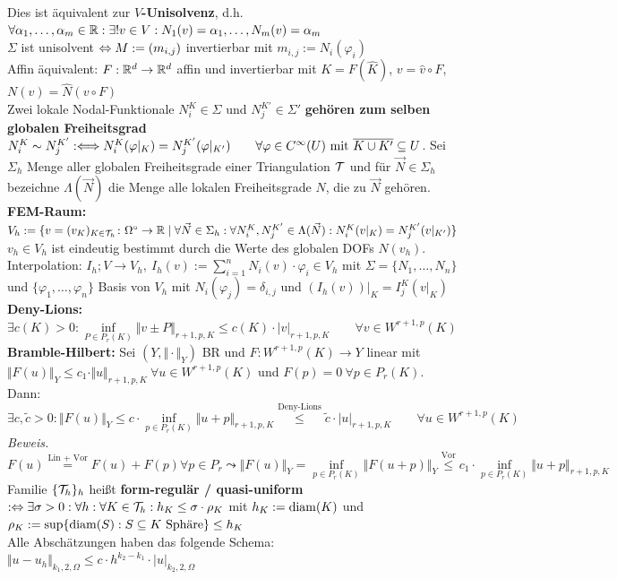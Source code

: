 \documentclass[12pt]{scrartcl}
\begin{document}
	Dies ist äquivalent zur \textbf{$V$-Unisolvenz}, d.h. $\forall\alpha_1,\ldots,\alpha_m\in\R:\exists! v\in V:N_1(v)=\alpha_1,\ldots,N_m(v)=\alpha_m$\\
	$\Sigma$ ist unisolvent $\gdw M:=(m_{i,j})$ invertierbar mit $m_{i,j}:=N_i(\varphi_i)$\\
	Affin äquivalent: $F:\R^d\to\R^d$ affin und invertierbar mit $K=F(\hat{K})$, $v=\hat{v}\circ F$, $N(v)=\hat{N}(v\circ F)$\\
	Zwei lokale Nodal-Funktionale $N_i^K\in\Sigma$ und $N_j^{K'}\in\Sigma'$ \textbf{gehören zum selben globalen Freiheitsgrad} $N_i^K\sim N_j^{K'}:\Longleftrightarrow N_i^K(\varphi|_K)=N_j^{K'}(\varphi|_{K'})\qquad\forall\varphi\in C^\infty(U)\mit\overline{K\cup K'}\subseteq U$.
	Sei $\Sigma_h$ Menge aller globalen Freiheitsgrade einer Triangulation $\T$ und für $\vec{N}\in\Sigma_h$ bezeichne $\Lambda(\vec{N})$ die Menge alle lokalen Freiheitsgrade $N$, die zu $\vec{N}$ gehören.\\
	\textbf{FEM-Raum:} $V_h:=\lbrace v=(v_{K})_{K\in\T_h}\colon\Omega^\circ\to\R\mid \forall \vec{N}\in\Sigma_h:\forall N_i^{K},N_j^{K'}\in\Lambda(\vec{N}):N_i^{K}(v|_K)=N_j^{K'}(v|_{K'})\rbrace$\\
	$v_h\in V_h$ ist eindeutig bestimmt durch die Werte des globalen DOFs $N(v_h)$.\\
	Interpolation: $I_h;V\to V_h,~I_h(v):=\sum\limits_{i=1}^n N_i(v)\cdot\varphi_i\in V_h$ mit $\Sigma=\lbrace N_1,\ldots,N_n\rbrace$ und $\lbrace\varphi_1,\ldots,\varphi_n\rbrace$ Basis von $V_h$ mit $N_i(\varphi_j)=\delta_{i,j}$ und $(I_h(v))|_K=I_j^K(v|_K)$\\
	\textbf{Deny-Lions:} $\exists c(K)>0:\inf\limits_{P\in P_r(K)}\Vert v\pm P\Vert_{r+1,p,K}\leq c(K)\cdot |v|_{r+1,p,K}\qquad\forall v\in W^{r+1,p}(K)$\\
	\textbf{Bramble-Hilbert:} Sei $(Y,\Vert\cdot\Vert_Y)$ BR und $F:W^{r+1,p}(K)\to Y$ linear mit $\big\Vert F(u)\Vert_Y\leq c_1\cdot\Vert u\Vert_{r+1,p,K}~\forall u\in W^{r+1,p}(K)$ und $F(p)=0~\forall p\in P_r(K)$.\\
	Dann: $\exists c,\tilde{c}>0:\big\Vert F(u)\big\Vert_Y
		\leq c\cdot\inf\limits_{p\in P_r(K)}\Vert u+p\Vert_{r+1,p,K}
		\overset{\text{Deny-Lions}}{\leq}
		\tilde{c}\cdot |u|_{r+1,p,K}\qquad\forall u\in W^{r+1,p}(K)$\\
	\textit{Beweis.} $F(u)\overset{\text{Lin + Vor}}{=}F(u)+F(p)\forall p\in P_r\leadsto
		\Vert F(u)\Vert_Y
		=\inf\limits_{p\in P_r(K)}\Vert F(u+p)\big\Vert_Y
		\overset{\text{Vor}}{\leq}
		c_1\cdot\inf\limits_{p\in P_r(K)}\Vert u+p\Vert_{r+1,p,K}$\\
	Familie $\lbrace\T_h\rbrace_h$ heißt \textbf{form-regulär / quasi-uniform} $:\gdw\exists\sigma>0:\forall h:\forall K\in\T_h:h_K\leq\sigma\cdot \rho_K$ mit $h_K:=\diam(K)$ und $\rho_K:=\sup\lbrace\diam(S):S\subseteq K\text{ Sphäre}\rbrace\leq h_K$\\
	Alle Abschätzungen haben das folgende Schema: $\Vert u-u_h\Vert_{k_1,2,\Omega}\leq c\cdot h^{k_2-k_1}\cdot|u|_{k_2,2,\Omega}$
	
\end{document}
